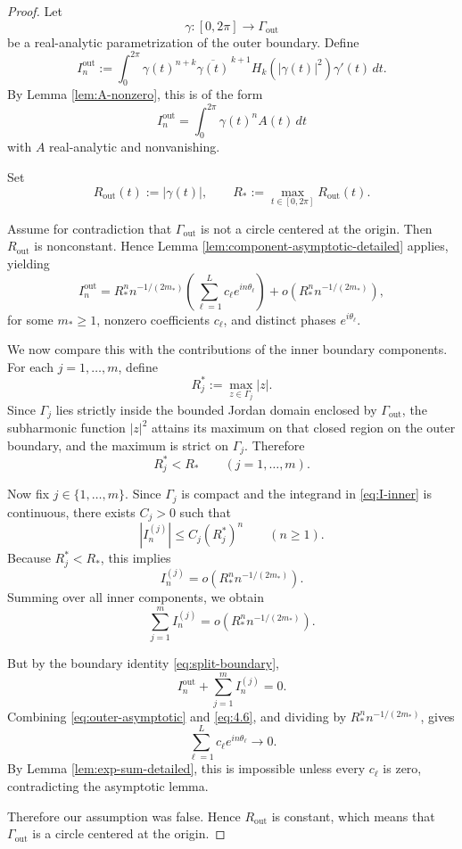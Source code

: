\documentclass[11pt]{amsart}
\theoremstyle{remark}
\newcommand{\1}{\mathbf 1}
\begin{document}
\begin{proof}
Let
\[
\gamma:[0,2\pi]\to \Gamma_{\mathrm{out}}
\]
be a real-analytic parametrization of the outer boundary. Define
\[
I_n^{\mathrm{out}}
:=
\int_0^{2\pi}
\gamma(t)^{n+k}\overline{\gamma(t)}^{\,k+1}
H_k(|\gamma(t)|^2)\gamma'(t)\,dt.
\tag{4.4}
\]
By Lemma \ref{lem:A-nonzero}, this is of the form
\[
I_n^{\mathrm{out}}=\int_0^{2\pi}\gamma(t)^nA(t)\,dt
\]
with $A$ real-analytic and nonvanishing.

Set
\[
R_{\mathrm{out}}(t):=|\gamma(t)|,
\qquad
R_*:=\max_{t\in[0,2\pi]} R_{\mathrm{out}}(t).
\]

Assume for contradiction that $\Gamma_{\mathrm{out}}$ is not a circle centered at the origin. Then $R_{\mathrm{out}}$ is nonconstant. Hence Lemma \ref{lem:component-asymptotic-detailed} applies, yielding
\begin{equation}\label{eq:outer-asymptotic}
I_n^{\mathrm{out}}
=
R_*^n n^{-1/(2m_*)}
\left(
\sum_{\ell=1}^L c_\ell e^{in\theta_\ell}
\right)
+
o\!\left(R_*^n n^{-1/(2m_*)}\right),
\end{equation}
for some $m_*\ge 1$, nonzero coefficients $c_\ell$, and distinct phases $e^{i\theta_\ell}$.

We now compare this with the contributions of the inner boundary components. For each $j=1,\dots,m$, define
\[
R_j^*:=\max_{z\in \Gamma_j}|z|.
\]
Since $\Gamma_j$ lies strictly inside the bounded Jordan domain enclosed by $\Gamma_{\mathrm{out}}$, the subharmonic function $|z|^2$ attains its maximum on that closed region on the outer boundary, and the maximum is strict on $\Gamma_j$. Therefore
\[
R_j^*<R_*
\qquad (j=1,\dots,m).
\tag{4.5}
\]

Now fix $j\in\{1,\dots,m\}$. Since $\Gamma_j$ is compact and the integrand in \eqref{eq:I-inner} is continuous, there exists $C_j>0$ such that
\[
|I_n^{(j)}|
\le
C_j (R_j^*)^n
\qquad (n\ge 1).
\]
Because $R_j^*<R_*$, this implies
\[
I_n^{(j)}=o\!\left(R_*^n n^{-1/(2m_*)}\right).
\]
Summing over all inner components, we obtain
\[
\sum_{j=1}^m I_n^{(j)}
=
o\!\left(R_*^n n^{-1/(2m_*)}\right).
\tag{4.6}
\]

But by the boundary identity \eqref{eq:split-boundary},
\[
I_n^{\mathrm{out}}+\sum_{j=1}^m I_n^{(j)}=0.
\]
Combining \eqref{eq:outer-asymptotic} and \eqref{eq:4.6}, and dividing by $R_*^n n^{-1/(2m_*)}$, gives
\[
\sum_{\ell=1}^L c_\ell e^{in\theta_\ell}\to 0.
\]
By Lemma \ref{lem:exp-sum-detailed}, this is impossible unless every $c_\ell$ is zero, contradicting the asymptotic lemma.

Therefore our assumption was false. Hence $R_{\mathrm{out}}$ is constant, which means that $\Gamma_{\mathrm{out}}$ is a circle centered at the origin.
\end{proof}
\end{document}

